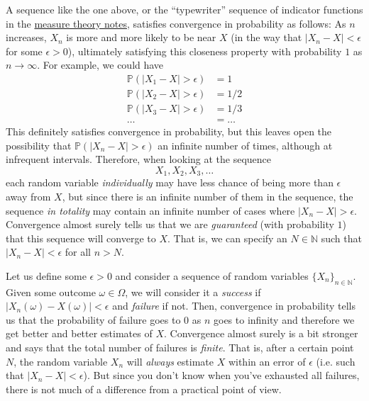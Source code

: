   A sequence like the one above, or the ``typewriter'' sequence of indicator functions in the \hyperref[mt-def:convergence-in-measure]{measure theory notes}, satisfies convergence in probability as follows: As $n$ increases, $X_n$ is more and more likely to be near $X$ (in the way that $|X_n - X| < \epsilon$ for some $\epsilon > 0$), ultimately satisfying this closeness property with probability $1$ as $n \rightarrow \infty$. For example, we could have 
  \begin{align*}
    \mathbb{P}(|X_1 - X| > \epsilon) & = 1 \\
    \mathbb{P}(|X_2 - X| > \epsilon) & = 1/2 \\
    \mathbb{P}(|X_3 - X| > \epsilon) & = 1/3 \\
    \ldots & = \ldots 
  \end{align*}
  This definitely satisfies convergence in probability, but this leaves open the possibility that $\mathbb{P}(|X_n - X| > \epsilon)$ an infinite number of times, although at infrequent intervals. Therefore, when looking at the sequence 
  \begin{equation}
    X_1, X_2, X_3, \ldots
  \end{equation}
  each random variable \textit{individually} may have less chance of being more than $\epsilon$ away from $X$, but since there is an infinite number of them in the sequence, the sequence \textit{in totality} may contain an infinite number of cases where $|X_n - X| > \epsilon$. Convergence almost surely tells us that we are \textit{guaranteed} (with probability $1$) that this sequence will converge to $X$. That is, we can specify an $N \in \mathbb{N}$ such that $|X_n - X| < \epsilon$ for all $n > N$. 

  Let us define some $\epsilon > 0$ and consider a sequence of random variables $\{X_n\}_{n \in \mathbb{N}}$. Given some outcome $\omega \in \Omega$, we will consider it a \textit{success} if $|X_n(\omega) - X(\omega)| < \epsilon$ and \textit{failure} if not. Then, convergence in probability tells us that the probability of failure goes to $0$ as $n$ goes to infinity and therefore we get better and better estimates of $X$. Convergence almost surely is a bit stronger and says that the total number of failures is \textit{finite}. That is, after a certain point $N$, the random variable $X_n$ will \textit{always} estimate $X$ within an error of $\epsilon$ (i.e. such that $|X_n - X| < \epsilon$). But since you don't know when you've exhausted all failures, there is not much of a difference from a practical point of view. 

